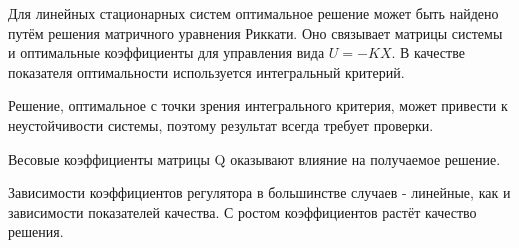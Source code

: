 \documentclass[14pt,a4paper,report]{report}
\begin{document}
Для линейных стационарных систем оптимальное решение может быть найдено путём решения матричного уравнения Риккати. Оно связывает матрицы системы и
оптимальные коэффициенты для управления вида $U=-KX$. В качестве показателя
оптимальности используется интегральный критерий.

Решение, оптимальное с точки зрения интегрального критерия, может привести к неустойчивости системы, поэтому результат всегда требует проверки.

Весовые коэффициенты матрицы Q оказывают влияние на получаемое решение.

Зависимости коэффициентов регулятора в большинстве случаев - линейные, как и зависимости  показателей качества. С ростом коэффициентов растёт качество решения.
\end{document}
